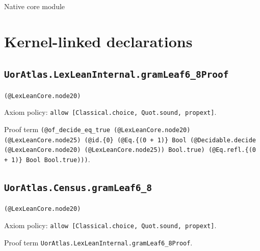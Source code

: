 \documentclass[11pt]{article}
\begin{document}
\begin{center}{\LARGE Native core module}\end{center}
\section*{Kernel-linked declarations}
\subsection*{\texttt{UorAtlas.LexLeanInternal.gramLeaf6\_8Proof}}
\noindent\texttt{(@LexLeanCore.node20)}\par
\noindent Axiom policy: \texttt{allow [Classical.choice, Quot.sound, propext]}.\par
\noindent Proof term \texttt{(@of\_decide\_eq\_true (@LexLeanCore.node20) (@LexLeanCore.node25) (@id.\{0\} (@Eq.\{(0 + 1)\} Bool (@Decidable.decide (@LexLeanCore.node20) (@LexLeanCore.node25)) Bool.true) (@Eq.refl.\{(0 + 1)\} Bool Bool.true)))}.\par
\subsection*{\texttt{UorAtlas.Census.gramLeaf6\_8}}
\noindent\texttt{(@LexLeanCore.node20)}\par
\noindent Axiom policy: \texttt{allow [Classical.choice, Quot.sound, propext]}.\par
\noindent Proof term \texttt{UorAtlas.LexLeanInternal.gramLeaf6\_8Proof}.\par
\end{document}
